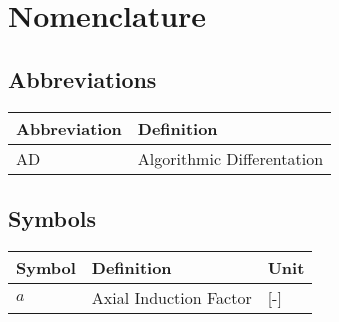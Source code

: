 \chapter*{Nomenclature}

\section*{Abbreviations}

\begin{longtable}{p{2.5cm}p{7cm}}
    \toprule
    Abbreviation & Definition \\
    \midrule\endhead %
    AD & Algorithmic Differentation \\
    \bottomrule
\end{longtable}

\section*{Symbols}

\begin{longtable}{p{2.5cm}p{8cm}p{2.5cm}}
    \toprule
    Symbol & Definition & Unit \\
    \midrule\endhead %
    $a$ & Axial Induction Factor & [-] \\
    \bottomrule
\end{longtable}
